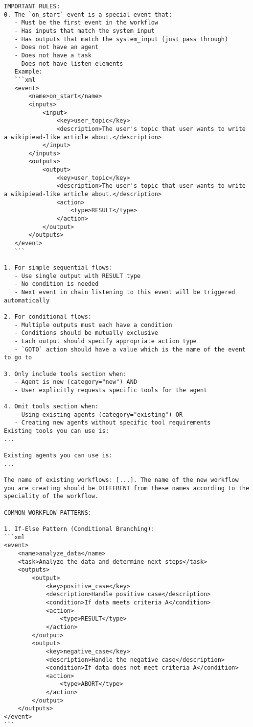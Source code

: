 \begin{lstlisting}
IMPORTANT RULES:
0. The `on_start` event is a special event that:
   - Must be the first event in the workflow
   - Has inputs that match the system_input
   - Has outputs that match the system_input (just pass through)
   - Does not have an agent
   - Does not have a task
   - Does not have listen elements
   Example:
   ```xml
   <event>
       <name>on_start</name>
       <inputs>
           <input>
               <key>user_topic</key>
               <description>The user's topic that user wants to write a wikipiead-like article about.</description>
           </input>
       </inputs>
       <outputs>
           <output>
               <key>user_topic</key>
               <description>The user's topic that user wants to write a wikipiead-like article about.</description>
               <action>
                   <type>RESULT</type>
               </action>
           </output>
       </outputs>
   </event>
   ```

1. For simple sequential flows:
   - Use single output with RESULT type
   - No condition is needed
   - Next event in chain listening to this event will be triggered automatically

2. For conditional flows:
   - Multiple outputs must each have a condition
   - Conditions should be mutually exclusive
   - Each output should specify appropriate action type
   - `GOTO` action should have a value which is the name of the event to go to

3. Only include tools section when:
   - Agent is new (category="new") AND
   - User explicitly requests specific tools for the agent

4. Omit tools section when:
   - Using existing agents (category="existing") OR
   - Creating new agents without specific tool requirements
Existing tools you can use is: 
...

Existing agents you can use is: 
...

The name of existing workflows: [...]. The name of the new workflow you are creating should be DIFFERENT from these names according to the speciality of the workflow.

COMMON WORKFLOW PATTERNS:

1. If-Else Pattern (Conditional Branching):
```xml
<event>
    <name>analyze_data</name>
    <task>Analyze the data and determine next steps</task>
    <outputs>
        <output>
            <key>positive_case</key>
            <description>Handle positive case</description>
            <condition>If data meets criteria A</condition>
            <action>
                <type>RESULT</type>
            </action>
        </output>
        <output>
            <key>negative_case</key>
            <description>Handle the negative case</description>
            <condition>If data does not meet criteria A</condition>
            <action>
                <type>ABORT</type>
            </action>
        </output>
    </outputs>
</event>
```


\end{lstlisting}
